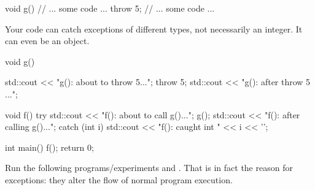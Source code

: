 \begin{console}
void g()
{    
     // ... some code ...
     throw 5;
     // ... some code ...
}
\end{console}

Your code can catch exceptions of different types, not necessarily an
integer. It can even be an object.

\begin{console}
void g()
{    
     std::cout << "g(): about to throw 5...\n";
     throw 5;
     std::cout << "g(): after throw 5 ...\n";

}

void f()
{    
     try
     {
           std::cout << "f(): about to call g()...\n";
           g();
           std::cout << "f(): after calling g()...\n";
     }
     catch (int i)
     {     
           std::cout << "f(): caught int " << i << '\n';
     }
}

int main()
{   
    f();
    return 0;
}
\end{console}

Run the following programs/experiments and . That is in fact the reason for exceptions: they alter the flow of normal program execution.

